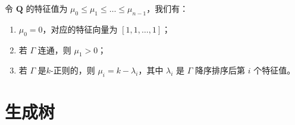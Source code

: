\begin{proposition}[Laplacian谱]
令 $\textbf{Q}$ 的特征值为 $\mu_0 \le \mu_1 \le \dots \le \mu_{n - 1}$，我们有：
\begin{enumerate}
    \item $\mu_0 = 0$，对应的特征向量为 $[1, 1, \dots, 1]$；
    \item 若 $\Gamma$ 连通，则 $\mu_1 > 0$；
    \item 若 $\Gamma$ 是$k$-正则的，则 $\mu_i = k - \lambda_i$，其中 $\lambda_i$ 是 $\Gamma$ 降序排序后第 $i$ 个特征值。
\end{enumerate}
\end{proposition}



\section{生成树}
























